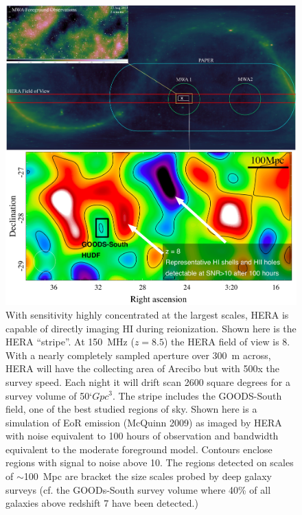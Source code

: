 \documentclass[preprint]{aastex}
\begin{document}
\begin{figure}[!ht]\centering
\includegraphics[width=\textwidth]{plots/Imaging/HERA_FoV_and_sim.jpg}%
\caption{\small
With sensitivity highly concentrated at the largest scales, HERA is capable of directly imaging HI during reionization.  Shown here is the HERA ``stripe''.  At 150~MHz ($z=8.5$) the HERA field of view is 8\arcdeg.  With a nearly completely sampled aperture over 300~m across, HERA will have the collecting area of Arecibo but with 500x the survey speed. Each night it will drift scan 2600 square degrees for a survey volume of 50`$Gpc^3$.  The stripe includes the GOODS-South field, one of the best studied regions of sky.  Shown here is a simulation of EoR emission (McQuinn 2009) as imaged by HERA with noise equivalent to 100 hours of observation and bandwidth equivalent to the moderate foreground model. %
Contours enclose regions with signal to noise above 10.  The regions detected on scales of $\sim$100~Mpc are bracket the size scales probed by deep galaxy surveys (cf. the GOODs-South survey volume where 40\% of all galaxies above redshift 7 have been detected.)  \label{fig:imaging}}
\end{figure}    

\end{document}
